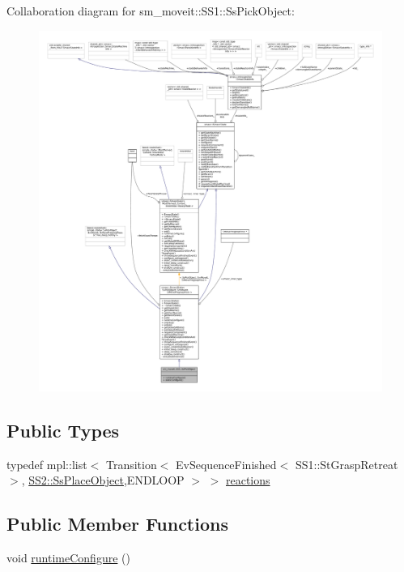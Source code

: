 Collaboration diagram for sm\+\_\+moveit\+:\+:S\+S1\+:\+:Ss\+Pick\+Object\+:
\nopagebreak
\begin{figure}[H]
\begin{center}
\leavevmode
\includegraphics[width=350pt]{structsm__moveit_1_1SS1_1_1SsPickObject__coll__graph}
\end{center}
\end{figure}
\subsection*{Public Types}
\begin{DoxyCompactItemize}
\item 
typedef mpl\+::list$<$ Transition$<$ Ev\+Sequence\+Finished$<$ S\+S1\+::\+St\+Grasp\+Retreat $>$, \hyperlink{structsm__moveit_1_1SS2_1_1SsPlaceObject}{S\+S2\+::\+Ss\+Place\+Object},E\+N\+D\+L\+O\+OP $>$ $>$ \hyperlink{structsm__moveit_1_1SS1_1_1SsPickObject_a09ca288c69453a5d565bde88ec871ff9}{reactions}
\end{DoxyCompactItemize}
\subsection*{Public Member Functions}
\begin{DoxyCompactItemize}
\item 
void \hyperlink{structsm__moveit_1_1SS1_1_1SsPickObject_acb8cbbad6e452a98ff2ccf93a6bdd1a4}{runtime\+Configure} ()
\end{DoxyCompactItemize}
